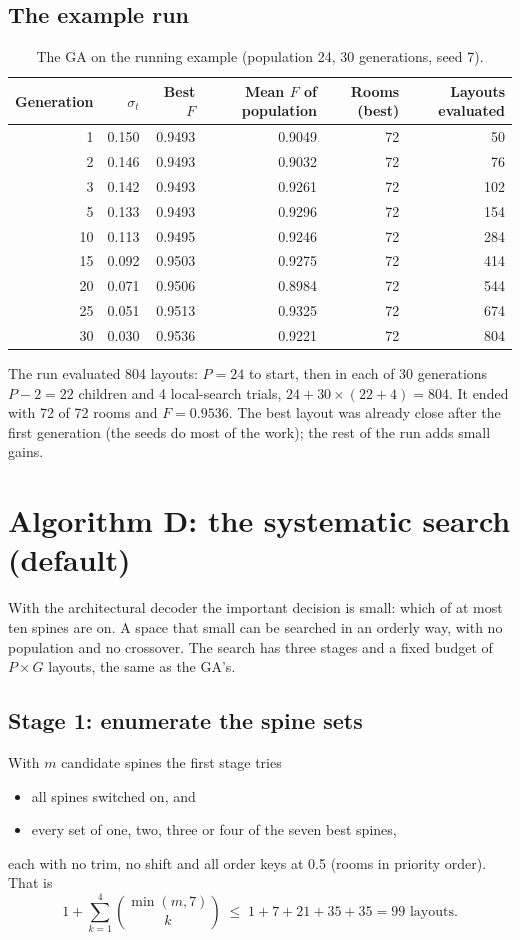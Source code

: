 \documentclass[10pt,a4paper]{article}
\begin{document}
\subsection{The example run}
\begin{table}[H]\centering\small\caption{The GA on the running example (population 24, 30 generations, seed 7).}\label{tab:ga}
\begin{tabular}{@{}r r r r r r@{}}
\toprule
\textbf{Generation} & \textbf{$\sigma_t$} & \textbf{Best $F$} & \textbf{Mean $F$ of population} & \textbf{Rooms (best)} & \textbf{Layouts evaluated} \\ \midrule
1 & 0.150 & 0.9493 & 0.9049 & 72 & 50 \\
2 & 0.146 & 0.9493 & 0.9032 & 72 & 76 \\
3 & 0.142 & 0.9493 & 0.9261 & 72 & 102 \\
5 & 0.133 & 0.9493 & 0.9296 & 72 & 154 \\
10 & 0.113 & 0.9495 & 0.9246 & 72 & 284 \\
15 & 0.092 & 0.9503 & 0.9275 & 72 & 414 \\
20 & 0.071 & 0.9506 & 0.8984 & 72 & 544 \\
25 & 0.051 & 0.9513 & 0.9325 & 72 & 674 \\
30 & 0.030 & 0.9536 & 0.9221 & 72 & 804 \\
\bottomrule
\end{tabular}
\end{table}
The run evaluated 804 layouts: $P = 24$ to start, then in each of 30 generations
$P - 2 = 22$ children and 4 local-search trials, $24 + 30 \times (22 + 4) = 804$.
It ended with 72 of 72 rooms and $F = 0.9536$. The best layout was already close after the first
generation (the seeds do most of the work); the rest of the run adds small gains.


\section{Algorithm D: the systematic search (default)}\label{sec:sys}
With the architectural decoder the important decision is small: which of at most ten spines are on. A space that
small can be searched in an orderly way, with no population and no crossover. The search has three stages and a fixed
budget of $P \times G$ layouts, the same as the GA's.

\subsection{Stage 1: enumerate the spine sets}
With $m$ candidate spines the first stage tries
\begin{itemize}
\item all spines switched on, and
\item every set of one, two, three or four of the seven best spines,
\end{itemize}
each with no trim, no shift and all order keys at 0.5 (rooms in priority order). That is
\[ 1 + \sum_{k=1}^{4} \binom{\min(m,7)}{k} \;\le\; 1 + 7 + 21 + 35 + 35 = 99 \text{ layouts.} \]
\end{document}
